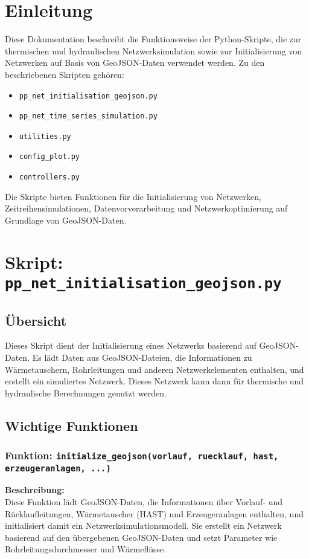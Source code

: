 \section{Einleitung}

Diese Dokumentation beschreibt die Funktionsweise der Python-Skripte, die zur thermischen und hydraulischen Netzwerksimulation sowie zur Initialisierung von Netzwerken auf Basis von GeoJSON-Daten verwendet werden. Zu den beschriebenen Skripten gehören:

\begin{itemize}
    \item \texttt{pp\_net\_initialisation\_geojson.py}
    \item \texttt{pp\_net\_time\_series\_simulation.py}
    \item \texttt{utilities.py}
    \item \texttt{config\_plot.py}
    \item \texttt{controllers.py}
\end{itemize}

Die Skripte bieten Funktionen für die Initialisierung von Netzwerken, Zeitreihensimulationen, Datenvorverarbeitung und Netzwerkoptimierung auf Grundlage von GeoJSON-Daten.

\section{Skript: \texttt{pp\_net\_initialisation\_geojson.py}}

\subsection{Übersicht}
Dieses Skript dient der Initialisierung eines Netzwerks basierend auf GeoJSON-Daten. Es lädt Daten aus GeoJSON-Dateien, die Informationen zu Wärmetauschern, Rohrleitungen und anderen Netzwerkelementen enthalten, und erstellt ein simuliertes Netzwerk. Dieses Netzwerk kann dann für thermische und hydraulische Berechnungen genutzt werden.

\subsection{Wichtige Funktionen}

\subsubsection{Funktion: \texttt{initialize\_geojson(vorlauf, ruecklauf, hast, erzeugeranlagen, ...)}}
\textbf{Beschreibung:}\\
Diese Funktion lädt GeoJSON-Daten, die Informationen über Vorlauf- und Rücklaufleitungen, Wärmetauscher (HAST) und Erzeugeranlagen enthalten, und initialisiert damit ein Netzwerksimulationsmodell. Sie erstellt ein Netzwerk basierend auf den übergebenen GeoJSON-Daten und setzt Parameter wie Rohrleitungsdurchmesser und Wärmeflüsse.

